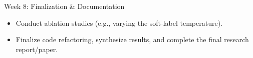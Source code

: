 \documentclass[11pt,a4paper]{article}
\begin{document}
\begin{timelinebox}{Week 8: Finalization \& Documentation}
\begin{itemize}[leftmargin=*,nosep]
    \item Conduct ablation studies (e.g., varying the soft-label temperature).
    \item Finalize code refactoring, synthesize results, and complete the final research report/paper.
\end{itemize}
\end{timelinebox}
\end{document}
